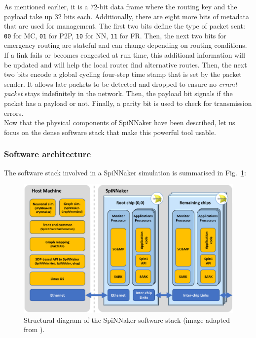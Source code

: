 As mentioned earlier, it is a 72-bit data frame where the routing key and the payload take up 32 bits each. Additionally, there are eight more bits of metadata that are used for management. The first two bits define the type of packet sent: \texttt{00} for MC, \texttt{01} for P2P, \texttt{10} for NN, \texttt{11} for FR. Then, the next two bits for emergency routing are stateful and can change depending on routing conditions. If a link fails or becomes congested at run time, this additional information will be updated and will help the local router find alternative routes. Then, the next two bits encode a global cycling four-step time stamp that is set by the packet sender. It allows late packets to be detected and dropped to ensure no \textit{errant packet} stays indefinitely in the network. Then, the payload bit signals if the packet has a payload or not. Finally, a parity bit is used to check for transmission errors. \\

Now that the physical components of SpiNNaker have been described, let us focus on the dense software stack that make this powerful tool usable.

\subsubsection{Software architecture} \label{sec:sw}

The software stack involved in a SpiNNaker simulation is summarised in Fig.~\ref{fig:software_stack}:

\begin{figure}[hbtp]
\centering
\includegraphics[width = 1\hsize]{figures/software_stack.png}
\caption{Structural diagram of the SpiNNaker software stack (image adapted from \cite{spinnaker}).}
\label{fig:software_stack}
\end{figure}

